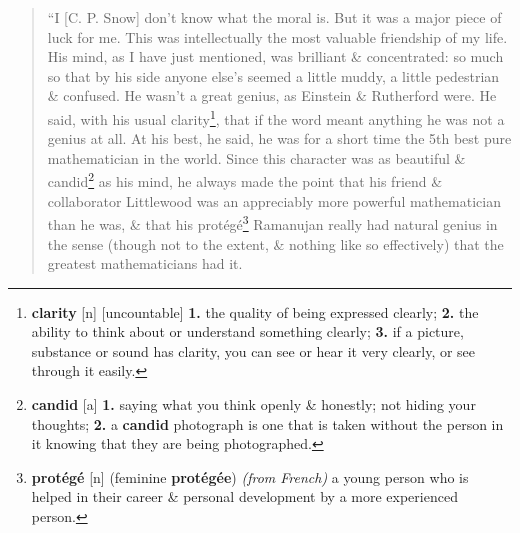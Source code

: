 \documentclass[oneside]{book}
\numberwithin{equation}{section}
\begin{document}
\begin{quotation}
	``I [C. P. Snow] don't know what the moral is. But it was a major piece of luck for me. This was intellectually the most valuable friendship of my life. His mind, as I have just mentioned, was brilliant \& concentrated: so much so that by his side anyone else's seemed a little muddy, a little pedestrian \& confused. He wasn't a great genius, as Einstein \& Rutherford were. He said, with his usual clarity\footnote{\textbf{clarity} [n] [uncountable] \textbf{1.} the quality of being expressed clearly; \textbf{2.} the ability to think about or understand something clearly; \textbf{3.} if a picture, substance or sound has clarity, you can see or hear it very clearly, or see through it easily.}, that if the word meant anything he was not a genius at all. At his best, he said, he was for a short time the 5th best pure mathematician in the world. Since this character was as beautiful \& candid\footnote{\textbf{candid} [a] \textbf{1.} saying what you think openly \& honestly; not hiding your thoughts; \textbf{2.} a \textbf{candid} photograph is one that is taken without the person in it knowing that they are being photographed.} as his mind, he always made the point that his friend \& collaborator Littlewood was an appreciably more powerful mathematician than he was, \& that his prot\'eg\'e\footnote{\textbf{prot\'eg\'e} [n] (feminine \textbf{prot\'eg\'ee}) \textit{(from French)} a young person who is helped in their career \& personal development by a more experienced person.} Ramanujan really had natural genius in the sense (though not to the extent, \& nothing like so effectively) that the greatest mathematicians had it.
	

\end{quotation}
\end{document}
